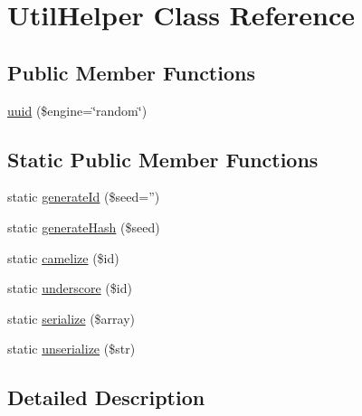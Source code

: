 \hypertarget{class_utopia_1_1_components_1_1_helper_1_1_util_helper}{
\section{UtilHelper Class Reference}
\label{class_utopia_1_1_components_1_1_helper_1_1_util_helper}
}
\subsection*{Public Member Functions}
\begin{DoxyCompactItemize}
\item 
\hyperlink{class_utopia_1_1_components_1_1_helper_1_1_util_helper_a73f74c2b520609b1b74972942f1406a7}{uuid} (\$engine=\char`\"{}random\char`\"{})
\end{DoxyCompactItemize}
\subsection*{Static Public Member Functions}
\begin{DoxyCompactItemize}
\item 
static \hyperlink{class_utopia_1_1_components_1_1_helper_1_1_util_helper_a19b4eb8ac2ce0f8ecd30ab2a460a9b25}{generateId} (\$seed='')
\item 
static \hyperlink{class_utopia_1_1_components_1_1_helper_1_1_util_helper_a6539ebb6a21fbd93451bbe596022ba05}{generateHash} (\$seed)
\item 
static \hyperlink{class_utopia_1_1_components_1_1_helper_1_1_util_helper_a842312778565a85a5db9129a05a1d33d}{camelize} (\$id)
\item 
static \hyperlink{class_utopia_1_1_components_1_1_helper_1_1_util_helper_acf1af4791d9cec561cfb78986ad4b559}{underscore} (\$id)
\item 
static \hyperlink{class_utopia_1_1_components_1_1_helper_1_1_util_helper_aa1d67a43aa10d596cf750c099d54b713}{serialize} (\$array)
\item 
static \hyperlink{class_utopia_1_1_components_1_1_helper_1_1_util_helper_a551df2ec312efca7928aada157fbec96}{unserialize} (\$str)
\end{DoxyCompactItemize}


\subsection{Detailed Description}



